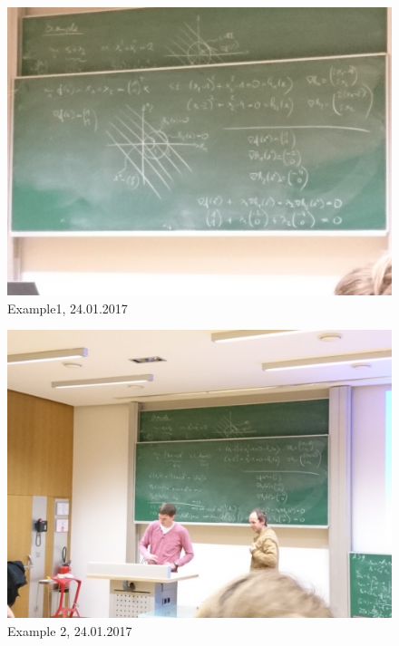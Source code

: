 \documentclass{report}
\begin{document}
\begin{figure}[H]
\includegraphics[scale=0.08]{2017_01_24-ex1.jpg}
\caption{Example1,  24.01.2017\label{fig:ex1}}
\end{figure}

\begin{figure}[H]
\includegraphics[scale=0.08]{2017_01_24-ex2.jpg}
\caption{Example 2,  24.01.2017\label{fig:ex2}}
\end{figure}
\end{document}
